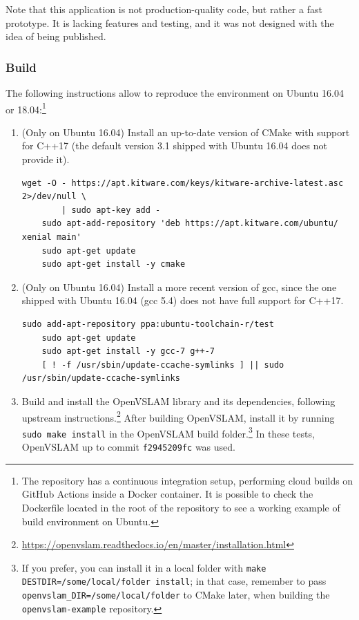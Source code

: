 \documentclass[11pt, letterpaper, twoside]{article}
\begin{document}
Note that this application is not production-quality code, but rather a fast
prototype. It is lacking features and testing, and it was not designed with the
idea of being published.

\subsubsection{Build}

The following instructions allow to reproduce the environment on Ubuntu 16.04
or 18.04:\footnote{The repository has a continuous integration setup,
performing cloud builds on GitHub Actions inside a Docker container. It is
possible to check the Dockerfile located in the root of the repository to see a
working example of build environment on Ubuntu.}
\begin{enumerate}
    \item (Only on Ubuntu 16.04) Install an up-to-date version of CMake with
        support for C++17 (the default version 3.1 shipped with Ubuntu 16.04
        does not provide it).
\begin{Verbatim}[samepage=true]
    wget -O - https://apt.kitware.com/keys/kitware-archive-latest.asc 2>/dev/null \
        | sudo apt-key add -
    sudo apt-add-repository 'deb https://apt.kitware.com/ubuntu/ xenial main'
    sudo apt-get update
    sudo apt-get install -y cmake
\end{Verbatim}

    \item (Only on Ubuntu 16.04) Install a more recent version of gcc, since
        the one shipped with Ubuntu 16.04 (gcc 5.4) does not have full support
        for C++17.
\begin{Verbatim}[samepage=true]
    sudo add-apt-repository ppa:ubuntu-toolchain-r/test
    sudo apt-get update
    sudo apt-get install -y gcc-7 g++-7
    [ ! -f /usr/sbin/update-ccache-symlinks ] || sudo /usr/sbin/update-ccache-symlinks
\end{Verbatim}

    \item Build and install the OpenVSLAM library and its dependencies,
        following upstream
        instructions.\footnote{\url{https://openvslam.readthedocs.io/en/master/installation.html}}
        After building OpenVSLAM, install it by running \texttt{sudo make
        install} in the OpenVSLAM build folder.\footnote{If you prefer,
        you can install it in a local folder with \texttt{make
        DESTDIR=/some/local/folder install}; in that case, remember to pass
        \texttt{openvslam\_DIR=/some/local/folder} to CMake later, when
        building the \texttt{openvslam-example} repository.} In these tests,
        OpenVSLAM up to commit \texttt{f2945209fc} was used.


\end{enumerate}
\end{document}
